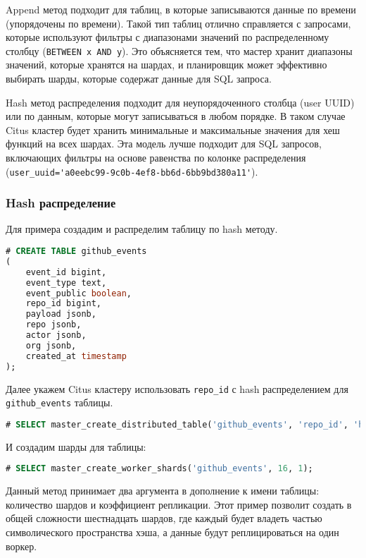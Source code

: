 Append метод подходит для таблиц, в которые записываются данные по времени (упорядочены по времени). Такой тип таблиц отлично справляется с запросами, которые используют фильтры с диапазонами значений по распределенному столбцу (\lstinline!BETWEEN x AND y!). Это объясняется тем, что мастер хранит диапазоны значений, которые хранятся на шардах, и планировщик может эффективно выбирать шарды, которые содержат данные для SQL запроса.

Hash метод распределения подходит для неупорядоченного столбца (user UUID) или по данным, которые могут записываться в любом порядке. В таком случае Citus кластер будет хранить минимальные и максимальные значения для хеш функций на всех шардах. Эта модель лучше подходит для SQL запросов, включающих фильтры на основе равенства по колонке распределения (\lstinline!user_uuid='a0eebc99-9c0b-4ef8-bb6d-6bb9bd380a11'!).


\subsubsection{Hash распределение}

Для примера создадим и распределим таблицу по hash методу.

\begin{lstlisting}[language=SQL,label=lst:citus_hash1,caption=Создание таблицы]
# CREATE TABLE github_events
(
    event_id bigint,
    event_type text,
    event_public boolean,
    repo_id bigint,
    payload jsonb,
    repo jsonb,
    actor jsonb,
    org jsonb,
    created_at timestamp
);
\end{lstlisting}

Далее укажем Citus кластеру использовать \lstinline!repo_id! с hash распределением для \lstinline!github_events! таблицы.

\begin{lstlisting}[language=SQL,label=lst:citus_hash2,caption=Создание hash распределения]
# SELECT master_create_distributed_table('github_events', 'repo_id', 'hash');
\end{lstlisting}

И создадим шарды для таблицы:

\begin{lstlisting}[language=SQL,label=lst:citus_hash2,caption=Создание шардов]
# SELECT master_create_worker_shards('github_events', 16, 1);
\end{lstlisting}

Данный метод принимает два аргумента в дополнение к имени таблицы: количество шардов и коэффициент репликации. Этот пример позволит создать в общей сложности шестнадцать шардов, где каждый будет владеть частью символического пространства хэша, а данные будут реплицироваться на один воркер.

